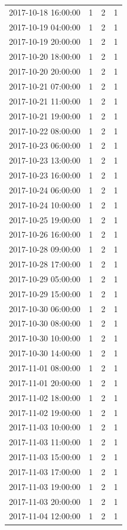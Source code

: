 \begin{tabular}{lrrr}
2017-10-18 16:00:00 & 1 & 2 & 1 \\
2017-10-19 04:00:00 & 1 & 2 & 1 \\
2017-10-19 20:00:00 & 1 & 2 & 1 \\
2017-10-20 18:00:00 & 1 & 2 & 1 \\
2017-10-20 20:00:00 & 1 & 2 & 1 \\
2017-10-21 07:00:00 & 1 & 2 & 1 \\
2017-10-21 11:00:00 & 1 & 2 & 1 \\
2017-10-21 19:00:00 & 1 & 2 & 1 \\
2017-10-22 08:00:00 & 1 & 2 & 1 \\
2017-10-23 06:00:00 & 1 & 2 & 1 \\
2017-10-23 13:00:00 & 1 & 2 & 1 \\
2017-10-23 16:00:00 & 1 & 2 & 1 \\
2017-10-24 06:00:00 & 1 & 2 & 1 \\
2017-10-24 10:00:00 & 1 & 2 & 1 \\
2017-10-25 19:00:00 & 1 & 2 & 1 \\
2017-10-26 16:00:00 & 1 & 2 & 1 \\
2017-10-28 09:00:00 & 1 & 2 & 1 \\
2017-10-28 17:00:00 & 1 & 2 & 1 \\
2017-10-29 05:00:00 & 1 & 2 & 1 \\
2017-10-29 15:00:00 & 1 & 2 & 1 \\
2017-10-30 06:00:00 & 1 & 2 & 1 \\
2017-10-30 08:00:00 & 1 & 2 & 1 \\
2017-10-30 10:00:00 & 1 & 2 & 1 \\
2017-10-30 14:00:00 & 1 & 2 & 1 \\
2017-11-01 08:00:00 & 1 & 2 & 1 \\
2017-11-01 20:00:00 & 1 & 2 & 1 \\
2017-11-02 18:00:00 & 1 & 2 & 1 \\
2017-11-02 19:00:00 & 1 & 2 & 1 \\
2017-11-03 10:00:00 & 1 & 2 & 1 \\
2017-11-03 11:00:00 & 1 & 2 & 1 \\
2017-11-03 15:00:00 & 1 & 2 & 1 \\
2017-11-03 17:00:00 & 1 & 2 & 1 \\
2017-11-03 19:00:00 & 1 & 2 & 1 \\
2017-11-03 20:00:00 & 1 & 2 & 1 \\
2017-11-04 12:00:00 & 1 & 2 & 1 \\

\end{tabular}
